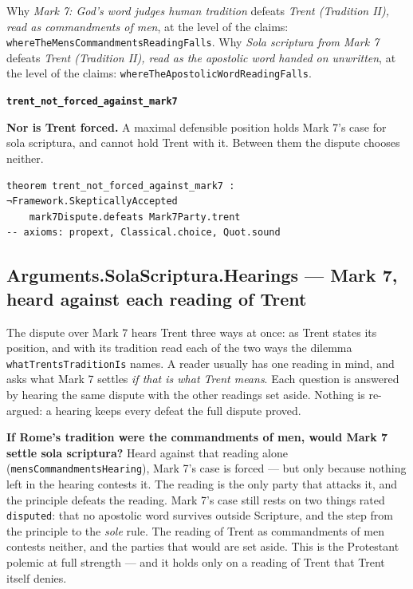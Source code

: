 \documentclass[11pt]{article}
\begin{document}
\noindent Why \emph{Mark 7: God's word judges human tradition} defeats \emph{Trent (Tradition II), read as commandments of men}, at the level of the claims: \texttt{where\allowbreak{}The\allowbreak{}Mens\allowbreak{}Commandments\allowbreak{}Reading\allowbreak{}Falls}.
\noindent Why \emph{Sola scriptura from Mark 7} defeats \emph{Trent (Tradition II), read as the apostolic word handed on unwritten}, at the level of the claims: \texttt{where\allowbreak{}The\allowbreak{}Apostolic\allowbreak{}Word\allowbreak{}Reading\allowbreak{}Falls}.
\par\medskip\noindent\textbf{\texttt{trent\_\allowbreak{}not\_\allowbreak{}forced\_\allowbreak{}against\_\allowbreak{}mark7}}\par\nobreak\noindent
\textbf{Nor is Trent forced.} A maximal defensible position holds Mark 7's case for sola scriptura, and cannot hold Trent with it. Between them the dispute chooses neither.

{\small\begin{verbatim}
theorem trent_not_forced_against_mark7 : ¬Framework.SkepticallyAccepted
    mark7Dispute.defeats Mark7Party.trent
-- axioms: propext, Classical.choice, Quot.sound
\end{verbatim}}
\subsection*{Arguments.SolaScriptura.Hearings — Mark 7, heard against each reading of Trent}
The dispute over Mark 7 hears Trent three ways at once: as Trent states its position, and with its tradition read each of the two ways the dilemma \texttt{what\allowbreak{}Trents\allowbreak{}Tradition\allowbreak{}Is} names. A reader usually has one reading in mind, and asks what Mark 7 settles \emph{if that is what Trent means}. Each question is answered by hearing the same dispute with the other readings set aside. Nothing is re-argued: a hearing keeps every defeat the full dispute proved.

\textbf{If Rome's tradition were the commandments of men, would Mark 7 settle sola scriptura?} Heard against that reading alone (\texttt{mens\allowbreak{}Commandments\allowbreak{}Hearing}), Mark 7's case is forced — but only because nothing left in the hearing contests it. The reading is the only party that attacks it, and the principle defeats the reading. Mark 7's case still rests on two things rated \texttt{disputed}: that no apostolic word survives outside Scripture, and the step from the principle to the \emph{sole} rule. The reading of Trent as commandments of men contests neither, and the parties that would are set aside. This is the Protestant polemic at full strength — and it holds only on a reading of Trent that Trent itself denies.
\end{document}

